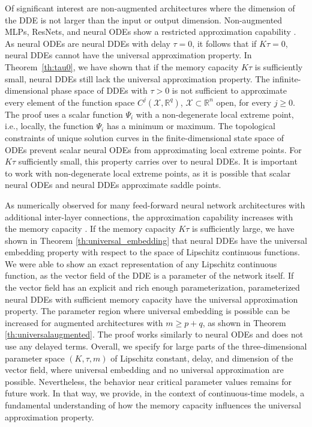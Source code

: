 \documentclass[10pt]{article}
\numberwithin{equation}{section}
\newcommand{\R}{\mathbb{R}}
\begin{document}
	Of significant interest are non-augmented architectures where the dimension of the DDE is not larger than the input or output dimension. Non-augmented MLPs, ResNets, and neural ODEs show a restricted approximation capability \cite{Hanin2018,Johnson2018,Kuehn2023,Park2020}. As neural ODEs are neural DDEs with delay $\tau = 0$, it follows that if $K\tau = 0$, neural DDEs cannot have the universal approximation property. In Theorem~\ref{th:tau0}, we have shown that if the memory capacity $K\tau$ is sufficiently small, neural DDEs still lack the universal approximation property. The infinite-dimensional phase space of DDEs with $ \tau>0$ is not sufficient to approximate every element of the function space $C^j(\mathcal{X},\R^q)$, $\mathcal{X}\subset \R^n$ open, for every $j\geq 0$. The proof uses a scalar function $\Psi_i$ with a non-degenerate local extreme point, i.e., locally, the function $\Psi_i$ has a minimum or maximum. The topological constraints of unique solution curves in the finite-dimensional state space of ODEs prevent scalar neural ODEs from approximating local extreme points. For $K\tau$ sufficiently small, this property carries over to neural DDEs. It is important to work with non-degenerate local extreme points, as it is possible that scalar neural ODEs and neural DDEs approximate saddle points.
	
	As numerically observed for many feed-forward neural network architectures with additional inter-layer connections, the approximation capability increases with the memory capacity \cite{Huang2017,Sander2021,Srivastava2015,Wang2018}. If the memory capacity $K\tau$ is sufficiently large, we have shown in Theorem \ref{th:universal_embedding} that neural DDEs have the universal embedding property with respect to the space of Lipschitz continuous functions. We were able to show an exact representation of any Lipschitz continuous function, as the vector field of the DDE is a parameter of the network itself. If the vector field has an explicit and rich enough parameterization, parameterized neural DDEs with sufficient memory capacity have the universal approximation property. The parameter region where universal embedding is possible can be increased for augmented architectures with $m \geq p+q$, as shown in Theorem \ref{th:universalaugmented}. The proof works similarly to neural ODEs and does not use any delayed terms. Overall, we specify for large parts of the three-dimensional parameter space $(K,\tau,m)$ of Lipschitz constant, delay, and dimension of the vector field, where universal embedding and no universal approximation are possible. Nevertheless, the behavior near critical parameter values remains for future work. In that way, we provide, in the context of continuous-time models, a fundamental understanding of how the memory capacity influences the universal approximation property. 
	
\end{document}
